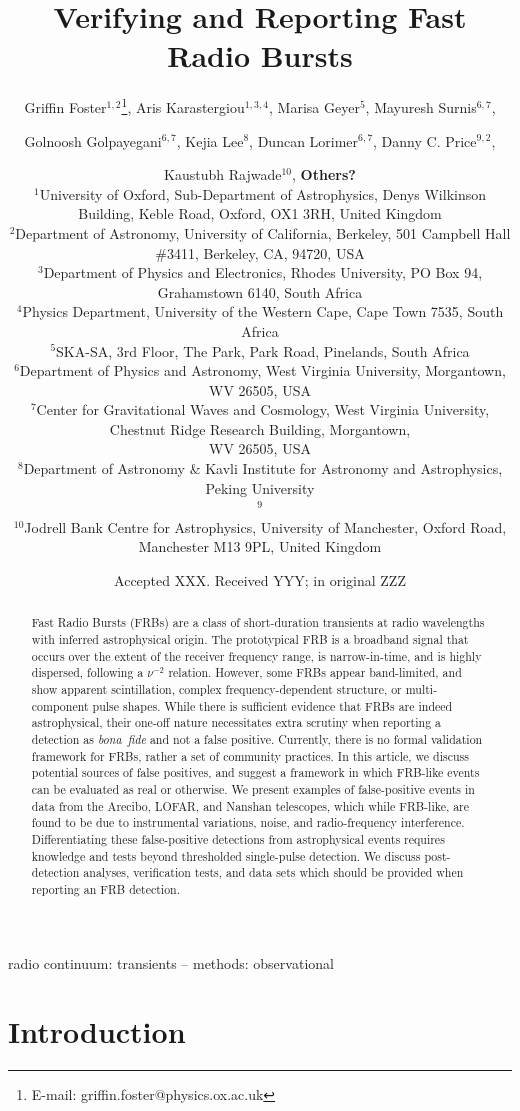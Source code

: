 \documentclass[a4paper,fleqn,usenatbib]{mnras}
\title[FRB Verification]{Verifying and Reporting Fast Radio Bursts}
\author[G. Foster et al.]{Griffin Foster$^{1,2}$\thanks{E-mail: griffin.foster@physics.ox.ac.uk},
Aris Karastergiou$^{1,3,4}$,
Marisa Geyer$^{5}$,
Mayuresh Surnis$^{6,7}$,
\and
Golnoosh Golpayegani$^{6,7}$,
Kejia Lee$^{8}$,
Duncan Lorimer$^{6,7}$,
Danny C. Price$^{9,2}$,
\and
Kaustubh Rajwade$^{10}$,
\textbf{Others?}
\\
$^{1}$University of Oxford, Sub-Department of Astrophysics, Denys Wilkinson Building, Keble Road, Oxford, OX1 3RH, United Kingdom\\
$^{2}$Department of Astronomy, University of California, Berkeley, 501 Campbell
Hall \#3411, Berkeley, CA, 94720, USA\\
$^{3}$Department of Physics and Electronics, Rhodes University,
    PO Box 94, Grahamstown 6140, South Africa\\
$^{4}$Physics Department, University of the Western Cape,
    Cape Town 7535, South Africa\\
$^{5}$SKA-SA, 3rd Floor, The Park, Park Road, Pinelands, South Africa\\
$^{6}$Department of Physics and Astronomy, West Virginia University, Morgantown, WV 26505, USA\\
$^{7}$Center for Gravitational Waves and Cosmology, West Virginia University, Chestnut Ridge Research Building, Morgantown,\\ WV 26505, USA\\
$^{8}$Department of Astronomy \& Kavli Institute for Astronomy and Astrophysics, Peking University\\
$^{9}$\SWIN \\
$^{10}$Jodrell Bank Centre for Astrophysics, University of Manchester, Oxford Road, Manchester M13 9PL, United Kingdom\\
}
\date{Accepted XXX. Received YYY; in original ZZZ}
\begin{document}
\label{firstpage}
\pagerange{\pageref{firstpage}--\pageref{lastpage}}
\maketitle

\begin{abstract}
Fast Radio Bursts (FRBs) are a class of short-duration transients at radio
wavelengths with inferred astrophysical origin.  The prototypical FRB is a
broadband signal that occurs over the extent of the receiver frequency range, is
narrow-in-time, and is highly dispersed, following a $\nu^{-2}$ relation.
However, some FRBs appear band-limited, and show apparent scintillation, complex
frequency-dependent structure, or multi-component pulse shapes.  While there is
sufficient evidence that FRBs are indeed astrophysical, their one-off nature
necessitates extra scrutiny when reporting a detection as \emph{bona~fide} and
not a false positive. Currently, there is no formal validation framework for
FRBs, rather a set of community practices. In this article, we discuss potential
sources of false positives, and suggest a framework in which FRB-like events can
be evaluated as real or otherwise.  We present examples of false-positive events
in data from the Arecibo, LOFAR, and Nanshan telescopes, which while FRB-like,
are found to be due to instrumental variations, noise, and radio-frequency
interference.  Differentiating these false-positive detections from
astrophysical events requires knowledge and tests beyond thresholded
single-pulse detection.  We discuss post-detection analyses, verification tests,
and data sets which should be provided when reporting an FRB detection.
\end{abstract}

\begin{keywords}
radio continuum: transients -- methods: observational
\end{keywords}


\section{Introduction}
\label{sec:intro}
\end{document}
